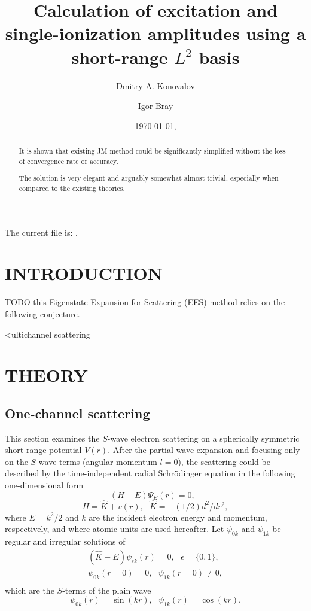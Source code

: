 \documentclass[aip
, pra
, showpacs
, aps
, twocolumn
, groupedaddress
, floatfix
]{revtex4}
\newcommand{\beq}{\begin{equation}}
\newcommand{\eeq}{\end{equation}}
\newcommand{\barr}{\begin{array}}
\newcommand{\earr}{\end{array}}
\begin{document}
\title {Calculation of excitation and single-ionization amplitudes using a short-range $L^2$ basis}

\author{Dmitry A. Konovalov}

\author{Igor Bray}


\date{\today, \currenttime}

\begin{abstract}
It is shown that existing JM method could be significantly simplified without the loss of convergence rate or accuracy.


The solution is very elegant and arguably somewhat almost trivial, especially when compared to
the existing theories.

\end{abstract}

\maketitle
The current file is: \currfilename.

\section{INTRODUCTION}
TODO
this Eigenstate Expansion for Scattering (EES) method relies on the following conjecture.

<ultichannel scattering \cite{CA73, NO72, TF79, Nesbet78, Lucchese86}

\section{THEORY}
\subsection{One-channel scattering}

This section examines the
$S$-wave electron scattering on a spherically symmetric short-range potential $V(r)$.
After the partial-wave expansion \cite{Taylor72,N82} and focusing only on the $S$-wave terms (angular momentum $l=0$), the scattering
could be described by the time-independent radial Schr\"odinger equation in the following one-dimensional form
\beq
(H-E) \Psi_E (r) =0,  \ \ \  \label{H_E_Psi_E}
\eeq
\beq
H = \hat{K} + v(r), \ \ \ \hat{K} = -(1/2) d^2/dr^2,
\eeq
where $E=k^2/2$ and $k$ are the incident electron energy and momentum, respectively, and where
atomic units are used hereafter.
Let $\psi_{0k}$ and $\psi_{1k}$ be regular and irregular solutions of
\beq \barr{l}
(\hat{K}-E)  \psi_{\epsilon k} (r) =0, \ \ \ \epsilon=\{0,1\},\\
\psi_{0k}(r=0) = 0, \ \ \ \psi_{1k}(r=0) \neq 0,\\
\earr \label{H_0_E_psi}\eeq
which are the $S$-terms of the plain wave
\beq
\psi_{0k}(r) = \sin(kr) ,\ \ \
\psi_{1k}(r) = \cos(kr).
\label{K} \eeq
\end{document}
